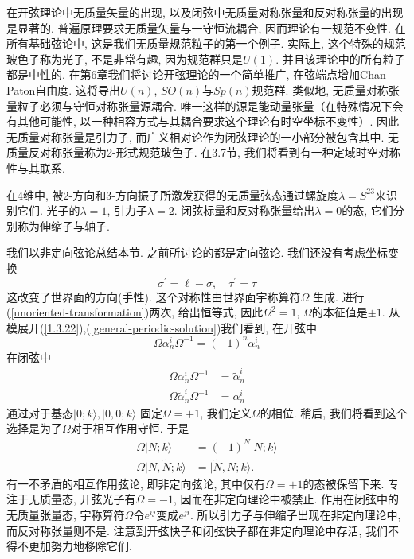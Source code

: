 在开弦理论中无质量矢量的出现, 以及闭弦中无质量对称张量和反对称张量的出现是显著的. 普遍原理要求无质量矢量与一守恒流耦合, 因而理论有一规范不变性. 在所有基础弦论中, 这是我们无质量规范粒子的第一个例子. 实际上, 这个特殊的规范玻色子称为光子, 不是非常有趣, 因为规范群只是$U(1)$. 并且该理论中的所有粒子都是中性的. 在第6章我们将讨论开弦理论的一个简单推广, 在弦端点增加Chan–Paton自由度. 这将导出$U(n)$, $SO(n)$与$Sp(n)$规范群. 类似地, 无质量对称张量粒子必须与守恒对称张量源耦合. 唯一这样的源是能动量张量（在特殊情况下会有其他可能性, 以一种相容方式与其耦合要求这个理论有时空坐标不变性）. 因此无质量对称张量是引力子, 而广义相对论作为闭弦理论的一小部分被包含其中. 无质量反对称张量称为2-形式规范玻色子. 在3.7节, 我们将看到有一种定域时空对称性与其联系. 

在4维中, 被2-方向和3-方向振子所激发获得的无质量弦态通过螺旋度$\lambda=S^{23}$来识别它们. 光子的$\lambda=1$, 引力子$\lambda=2$. 闭弦标量和反对称张量给出$\lambda=0$的态, 它们分别称为伸缩子与轴子. 

我们以非定向弦论总结本节. 之前所讨论的都是定向弦论. 我们还没有考虑坐标变换
\begin{equation}
\sigma^{\prime}=\ell-\sigma, \quad \tau^{\prime}=\tau \label{unoriented-transformation}
\end{equation}
这改变了世界面的方向(手性). 这个对称性由世界面宇称算符$\Omega$ 生成. 进行(\ref{unoriented-transformation})两次, 给出恒等式, 因此$\Omega^2=1$, $\Omega$的本征值是$\pm 1$. 从模展开(\ref{1.3.22}),(\ref{general-periodic-solution})我们看到, 在开弦中
\begin{equation}
\Omega \alpha_{n}^{i} \Omega^{-1}=(-1)^{n} \alpha_{n}^{i}
\end{equation}
在闭弦中
\begin{subequations}
\begin{align}
\Omega \alpha_{n}^{i} \Omega^{-1}&=\tilde{\alpha}_{n}^{i}\\
\Omega \tilde{\alpha}_{n}^{i} \Omega^{-1}&=\alpha_{n}^{i}
\end{align}
\end{subequations}
通过对于基态$|0;k\rangle,|0,0;k\rangle$ 固定$\Omega=+1$, 我们定义$\Omega$的相位.  稍后, 我们将看到这个选择是为了$\Omega$对于相互作用守恒. 于是
\begin{subequations}
\begin{align}
\Omega|N ; k\rangle&=(-1)^{N}|N ; k\rangle \\
\Omega|N, \tilde{N} ; k\rangle&=|\tilde{N}, N ; k\rangle.
\end{align}
\end{subequations}
有一不矛盾的相互作用弦论, 即非定向弦论, 其中仅有$\Omega=+1$的态被保留下来. 专注于无质量态, 开弦光子有$\Omega=-1$,  因而在非定向理论中被禁止. 作用在闭弦中的无质量张量态, 宇称算符$\Omega$令$e^{ij}$变成$e^{ji}$. 所以引力子与伸缩子出现在非定向理论中, 而反对称张量则不是. 注意到开弦快子和闭弦快子都在非定向理论中存活, 我们不得不更加努力地移除它们. 

